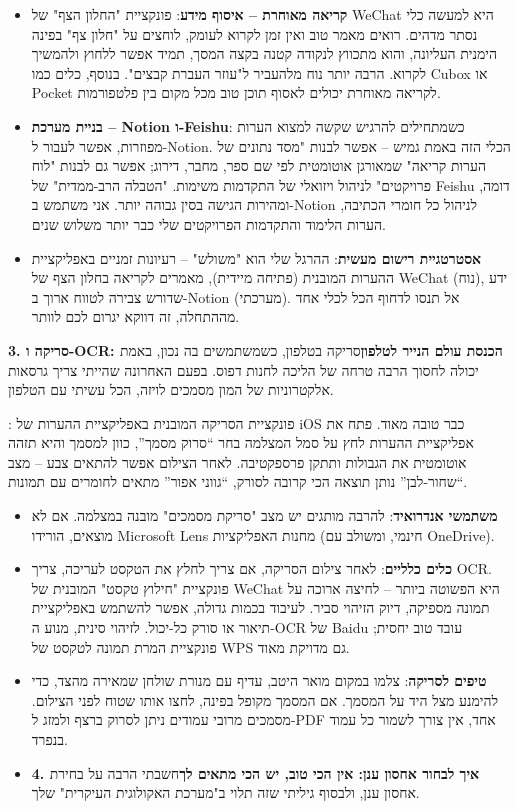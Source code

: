 \begin{itemize}
  \item \textbf{קריאה מאוחרת – איסוף מידע}: פונקציית "החלון הצף" של WeChat היא למעשה כלי נסתר מדהים. רואים מאמר טוב ואין זמן לקרוא לעומק, לוחצים על "חלון צף" בפינה הימנית העליונה, והוא מתכווץ לנקודה קטנה בקצה המסך, תמיד אפשר ללחוץ ולהמשיך לקרוא. הרבה יותר נוח מלהעביר ל"עוזר העברת קבצים". בנוסף, כלים כמו Cubox או Pocket לקריאה מאוחרת יכולים לאסוף תוכן טוב מכל מקום בין פלטפורמות.
  \item \textbf{בניית מערכת – Notion ו-Feishu}: כשמתחילים להרגיש שקשה למצוא הערות מפוזרות, אפשר לעבור ל-Notion. הכלי הזה באמת גמיש – אפשר לבנות "מסד נתונים של הערות קריאה" שמאורגן אוטומטית לפי שם ספר, מחבר, דירוג; אפשר גם לבנות "לוח פרויקטים" לניהול ויזואלי של התקדמות משימות. "הטבלה הרב-ממדית" של Feishu דומה, ומהירות הגישה בסין גבוהה יותר. אני משתמש ב-Notion לניהול כל חומרי הכתיבה, הערות הלימוד והתקדמות הפרויקטים שלי כבר יותר משלוש שנים.
  \item \textbf{אסטרטגיית רישום מעשית}: ההרגל שלי הוא "משולש" – רעיונות זמניים באפליקציית ההערות המובנית (פתיחה מיידית), מאמרים לקריאה בחלון הצף של WeChat (נוח), ידע שדורש צבירה לטווח ארוך ב-Notion (מערכתי). אל תנסו לדחוף הכל לכלי אחד מההתחלה, זה דווקא יגרום לכם לוותר.
\end{itemize}

\textbf{3. סריקה ו-OCR: הכנסת עולם הנייר לטלפון}סריקה בטלפון, כשמשתמשים בה נכון, באמת יכולה לחסוך הרבה טרחה של הליכה לחנות דפוס. בפעם האחרונה שהייתי צריך גרסאות אלקטרוניות של המון מסמכים לויזה, הכל עשיתי עם הטלפון.


: פונקציית הסריקה המובנית באפליקציית ההערות של iOS כבר טובה מאוד. פתח את אפליקציית ההערות לחץ על סמל המצלמה בחר “סרוק מסמך”, כוון למסמך והיא תזהה אוטומטית את הגבולות ותתקן פרספקטיבה. לאחר הצילום אפשר להתאים צבע – מצב “שחור-לבן” נותן תוצאה הכי קרובה לסורק, “גווני אפור” מתאים לחומרים עם תמונות.

\begin{itemize}
  \item \textbf{משתמשי אנדרואיד}: להרבה מותגים יש מצב "סריקת מסמכים" מובנה במצלמה. אם לא מוצאים, הורידו Microsoft Lens מחנות האפליקציות (חינמי, ומשולב עם OneDrive).
  \item \textbf{כלים כלליים}: לאחר צילום הסריקה, אם צריך לחלץ את הטקסט לעריכה, צריך OCR. פונקציית "חילוץ טקסט" המובנית של WeChat היא הפשוטה ביותר – לחיצה ארוכה על תמונה מספיקה, דיוק הזיהוי סביר. לעיבוד בכמות גדולה, אפשר להשתמש באפליקציית תיאור או סורק כל-יכול. לזיהוי סינית, מנוע ה-OCR של Baidu עובד טוב יחסית; פונקציית המרת תמונה לטקסט של WPS גם מדויקת מאוד.
  \item \textbf{טיפים לסריקה}: צלמו במקום מואר היטב, עדיף עם מנורת שולחן שמאירה מהצד, כדי להימנע מצל היד על המסמך. אם המסמך מקופל בפינה, לחצו אותו שטוח לפני הצילום. מסמכים מרובי עמודים ניתן לסרוק ברצף ולמזג ל-PDF אחד, אין צורך לשמור כל עמוד בנפרד.
  \item \textbf{4. איך לבחור אחסון ענן: אין הכי טוב, יש הכי מתאים לך}חשבתי הרבה על בחירת אחסון ענן, ולבסוף גיליתי שזה תלוי ב"מערכת האקולוגית העיקרית" שלך.
\end{itemize}


